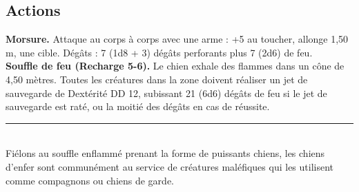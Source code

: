 \begin{figure*}[hb!]
{\begin{minipage}[c]{.45\linewidth}
    \subsection*{Actions}
    {\bfseries Morsure.} Attaque au corps à corps avec une arme : +5 au toucher, allonge 1,50 m, une cible. Dégâts : 7 (1d8 + 3) dégâts perforants plus 7 (2d6) de feu. \\
    {\bfseries Souffle de feu (Recharge 5-6).} Le chien exhale des flammes dans un cône de 4,50 mètres. Toutes les créatures dans la zone doivent réaliser un jet de sauvegarde de Dextérité DD 12, subissant 21 (6d6) dégâts de feu si le jet de sauvegarde est raté, ou la moitié des dégâts en cas de réussite. \\
    \noindent\rule{\textwidth}{1pt} \\
Fiélons au souffle enflammé prenant la forme de puissants chiens, les chiens d'enfer sont communément au service de créatures maléfiques qui les utilisent comme compagnons ou chiens de garde.
  \end{minipage}
}%
\end{figure*}

